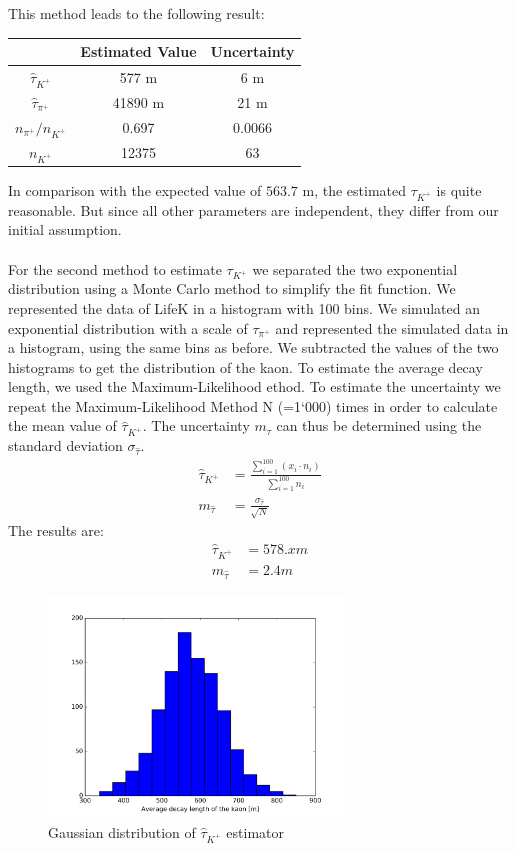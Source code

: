 \documentclass[a4paper,parskip,11pt, DIV12]{scrreprt}
\begin{document}
This method leads to the following result:\\
\begin{tabular}{c|cc}
\centering
 & Estimated Value  & Uncertainty \\ 
\hline 
$\hat{\tau}_{K^+}$ & 577 m & 6 m \\ 

$\hat{\tau}_{\pi^+}$ & 41890 m  & 21 m  \\

${n_{\pi^+}}/{n_{K^+}}$ & 0.697 & 0.0066 \\ 

$n_{K^+}$ & 12375 & 63 \\
\end{tabular} 

In comparison with the expected value of $563.7$ m, the estimated $\tau_{K^+}$ is quite reasonable. But since all other parameters are independent, they differ from our initial assumption.
\\
\\
For the second method to estimate $\tau_{K^+}$ we separated the two exponential distribution using a Monte Carlo method to simplify the fit function. We represented the data of LifeK in a histogram with 100 bins. We simulated an exponential distribution with a scale of $\tau_{\pi^+}$ and represented the simulated data in a histogram, using the same bins as before. We subtracted the values of the two histograms to get the distribution of the kaon. To estimate the average decay length, we used the Maximum-Likelihood ethod. To estimate the uncertainty we repeat the Maximum-Likelihood Method N (=1`000) times in order to calculate the mean value of $\hat{\tau}_{K^+}$. The uncertainty $m_{\tau}$ can thus be determined using the standard deviation $\sigma_{\hat{\tau}}$.
\begin{align*}
\hat{\tau}_{K^+}&= \frac{\sum_{i=1}^{100} (x_i \cdot n_i)}{\sum_{i=1}^{100} n_i}\\
m_{\hat{\tau}}&= \frac{\sigma_{\hat{\tau}}}{\sqrt{N}}
\end{align*}
The results are:
\begin{align*}
\hat{\tau}_{K^+}&=578.x m \\
m_{\hat{\tau}}&=2.4 m
\end{align*}

\begin{figure}[htbp] 
\centering
\includegraphics[width=0.7\textwidth]{hist_tau_estimator3.jpg}
\caption{Gaussian distribution of $\hat{\tau}_{K^+}$ estimator}
\label{fig:Bild1}
\end{figure}
\end{document}

